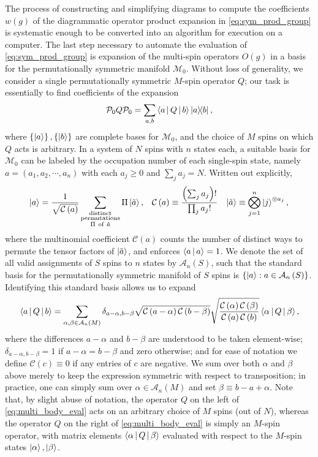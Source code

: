 \documentclass[nofootinbib,notitlepage,11pt]{revtex4-2}
\renewcommand{\t}{\text} %
\newcommand{\f}[2]{\dfrac{#1}{#2}} %
\newcommand{\p}[1]{\left(#1\right)} %
\renewcommand{\set}[1]{\left\{#1\right\}} %
\newcommand{\bk}{\Braket} %
\newcommand{\1}{\mathds{1}}
\newcommand{\A}{\mathcal{A}}
\newcommand{\C}{\mathcal{C}}
\newcommand{\M}{\mathcal{M}}
\renewcommand{\P}{\mathcal{P}}
\begin{document}
The process of constructing and simplifying diagrams to compute the
coefficients $w\p{g}$ of the diagrammatic operator product expansion
in \eqref{eq:sym_prod_group} is systematic enough to be converted into
an algorithm for execution on a computer.  The last step necessary to
automate the evaluation of \eqref{eq:sym_prod_group} is expansion of
the multi-spin operators $O\p{g}$ in a basis for the permutationally
symmetric manifold $\M_0$.  Without loss of generality, we consider a
single permutationally symmetric $M$-spin operator $Q$; our task is
essentially to find coefficients of the expansion
\begin{align}
  \P_0 Q \P_0
  = \sum_{a,b} \bk{a|Q|b} \op{a}{b},
\end{align}
where $\set{\ket{a}},\set{\ket{b}}$ are complete bases for $\M_0$, and
the choice of $M$ spins on which $Q$ acts is arbitrary.  In a system
of $N$ spins with $n$ states each, a suitable basis for $\M_0$ can be
labeled by the occupation number of each single-spin state, namely
$a=\p{a_1,a_2,\cdots,a_n}$ with each $a_j\ge 0$ and $\sum_ja_j=N$.
Written out explicitly,
\begin{align}
  \ket{a} = \f1{\sqrt{\C\p{a}}}
  \sum_{\substack{\t{distinct}\\\t{permutations}\\\Pi~\t{of}~\tilde a}}
  \Pi \ket{\tilde a},
  &&
  \C\p{a} \equiv \f{\p{\sum_j a_j}!}{\prod_ja_j!}
  &&
  \ket{\tilde a} \equiv \bigotimes_{j=1}^n \ket{j}^{\otimes a_j},
\end{align}
where the multinomial coefficient $\C\p{a}$ counts the number of
distinct ways to permute the tensor factors of $\ket{\tilde a}$, and
enforces $\bk{a|a}=1$.  We denote the set of all valid assignments of
$S$ spins to $n$ states by $\A_n\p{S}$, such that the standard basis
for the permutationally symmetric manifold of $S$ spins is
$\set{\ket{a}:a\in\A_n\p{S}}$.  Identifying this standard basis allows
us to expand
\begin{align}
  \bk{a|Q|b} = \sum_{\alpha,\beta\in\A_n\p{M}}
  \delta_{a-\alpha,b-\beta}
  \sqrt{\C\p{a-\alpha}\C\p{b-\beta}}
  \sqrt{\f{\C\p{\alpha}\C\p{\beta}}{\C\p{a}\C\p{b}}}
  \bk{\alpha|Q|\beta},
  \label{eq:multi_body_eval}
\end{align}
where the differences $a-\alpha$ and $b-\beta$ are understood to be
taken element-wise; $\delta_{a-\alpha,b-\beta}=1$ if
$a-\alpha=b-\beta$ and zero otherwise; and for ease of notation we
define $\C\p{c}\equiv 0$ if any entries of $c$ are negative.  We sum
over both $\alpha$ and $\beta$ above merely to keep the expression
symmetric with respect to transposition; in practice, one can simply
sum over $\alpha\in\A_n\p{M}$ and set $\beta\equiv b-a+\alpha$.  Note
that, by slight abuse of notation, the operator $Q$ on the left of
\eqref{eq:multi_body_eval} acts on an arbitrary choice of $M$ spins
(out of $N$), whereas the operator $Q$ on the right of
\eqref{eq:multi_body_eval} is simply an $M$-spin operator, with matrix
elements $\bk{\alpha|Q|\beta}$ evaluated with respect to the $M$-spin
states $\ket\alpha,\ket\beta$.
\end{document}
